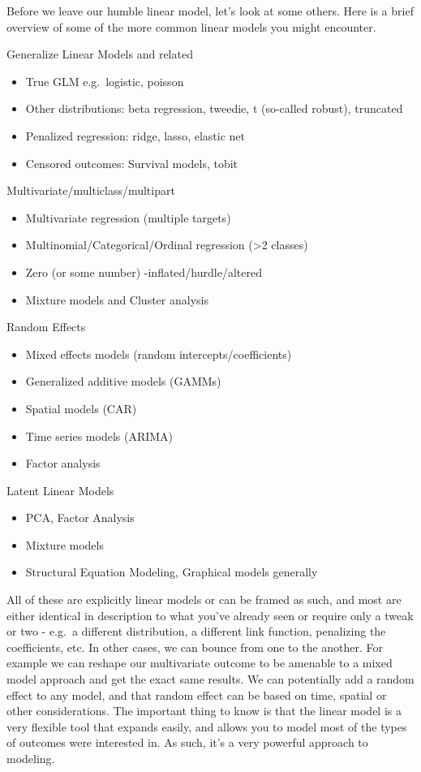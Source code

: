\documentclass[
  letterpaper,
]{krantz}
\providecommand{\tightlist}{%
  \setlength{\itemsep}{0pt}\setlength{\parskip}{0pt}}\usepackage{longtable,booktabs,array}
\begin{document}
Before we leave our humble linear model, let's look at some others. Here
is a brief overview of some of the more common linear models you might
encounter.

Generalize Linear Models and related

\begin{itemize}
\tightlist
\item
  True GLM e.g.~logistic, poisson
\item
  Other distributions: beta regression, tweedie, t (so-called robust),
  truncated
\item
  Penalized regression: ridge, lasso, elastic net
\item
  Censored outcomes: Survival models, tobit
\end{itemize}

Multivariate/multiclass/multipart

\begin{itemize}
\tightlist
\item
  Multivariate regression (multiple targets)
\item
  Multinomial/Categorical/Ordinal regression (\textgreater2 classes)
\item
  Zero (or some number) -inflated/hurdle/altered
\item
  Mixture models and Cluster analysis
\end{itemize}

Random Effects

\begin{itemize}
\tightlist
\item
  Mixed effects models (random intercepts/coefficients)
\item
  Generalized additive models (GAMMs)
\item
  Spatial models (CAR)
\item
  Time series models (ARIMA)
\item
  Factor analysis
\end{itemize}

Latent Linear Models

\begin{itemize}
\tightlist
\item
  PCA, Factor Analysis
\item
  Mixture models
\item
  Structural Equation Modeling, Graphical models generally
\end{itemize}

All of these are explicitly linear models or can be framed as such, and
most are either identical in description to what you've already seen or
require only a tweak or two - e.g.~a different distribution, a different
link function, penalizing the coefficients, etc. In other cases, we can
bounce from one to the another. For example we can reshape our
multivariate outcome to be amenable to a mixed model approach and get
the exact same results. We can potentially add a random effect to any
model, and that random effect can be based on time, spatial or other
considerations. The important thing to know is that the linear model is
a very flexible tool that expands easily, and allows you to model most
of the types of outcomes were interested in. As such, it's a very
powerful approach to modeling.
\end{document}
